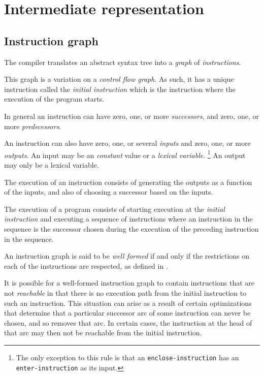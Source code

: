 \chapter{Intermediate representation}
\label{chap-ir}

\section{Instruction graph}

The compiler translates an abstract syntax tree into a \emph{graph} of
\emph{instructions}.

This graph is a variation on a \emph{control flow graph}.  As such, it
has a unique instruction called the \emph{initial instruction} which
is the instruction where the execution of the program starts.

In general an instruction can have zero, one, or more
\emph{successors}, and zero, one, or more \emph{predecessors}.

An instruction can also have zero, one, or several \emph{inputs} and
zero, one, or more \emph{outputs}.  An input may be an \emph{constant}
value or a \emph{lexical variable}.%
\footnote{The only exception to this rule is that an
  \texttt{enclose-instruction} has an \texttt{enter-instruction} as
  its input.}  An output may only be a lexical variable.

The execution of an instruction consists of generating the outputs as
a function of the inputs, and also of choosing a successor based on
the inputs.

The execution of a program consists of starting execution at the
\emph{initial instruction} and executing a sequence of instructions
where an instruction in the sequence is the successor chosen during
the execution of the preceding instruction in the sequence.

An instruction graph is said to be \emph{well formed} if and only if
the restrictions on each of the instructions are respected, as defined
in .

It is possible for a well-formed instruction graph to contain
instructions that are not \emph{reachable} in that there is no
execution path from the initial instruction to such an instruction.
This situation can arise as a result of certain optimizations that
determine that a particular successor arc of some instruction can
never be chosen, and so removes that arc.  In certain cases, the
instruction at the head of that arc may then not be reachable from the
initial instruction.

